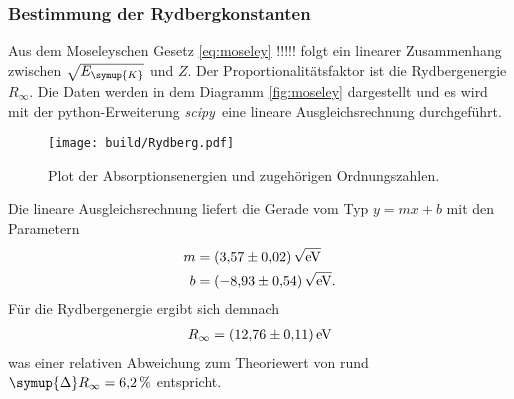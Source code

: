 \subsubsection{Bestimmung der Rydbergkonstanten}
Aus dem Moseleyschen Gesetz \eqref{eq:moseley} !!!!! folgt ein linearer Zusammenhang zwischen $\sqrt{E_{\symup{K}}}$ und $Z$. Der 
Proportionalitätsfaktor ist die Rydbergenergie $R_\infty$. Die Daten werden in dem Diagramm \autoref{fig:moseley} dargestellt und es wird
mit der python-Erweiterung \textit{scipy}\,\cite{scipy} eine lineare Ausgleichsrechnung durchgeführt.

\begin{figure}[H]
  \centering
  \texttt{[image: build/Rydberg.pdf]}
  \caption{Plot der Absorptionsenergien und zugehörigen Ordnungszahlen.}
  \label{fig:moseley}
\end{figure}

Die lineare Ausgleichsrechnung liefert die Gerade vom Typ $y = mx +b$ mit den Parametern
\begin{align*}
  m &= \qty{3,57+-0.02}{\sqrt{\unit{\electronvolt}}} \\
  b &= \qty{-8,93+-0.54}{\sqrt{\unit{\electronvolt}}}.
\end{align*}
Für die Rydbergenergie ergibt sich demnach 
\begin{align*}
  R_{\infty} = \qty{12.76+-0.11}{\electronvolt}
\end{align*}
was einer relativen Abweichung zum Theoriewert von rund $\symup{\Delta}R_{\infty} = \qty{6.2}{\percent}$ entspricht.